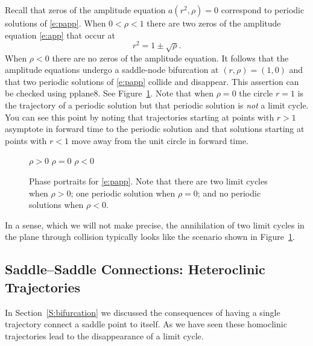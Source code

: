 \documentclass{ximera}
\begin{document}
Recall that zeros of the amplitude equation $a(r^2,\rho)=0$ correspond to 
periodic solutions of \eqref{e:papp}.  When $0<\rho<1$ there are two zeros of 
the amplitude equation \eqref{e:app} that occur at 
\[
r^2 = 1 \pm\sqrt{\rho}.
\]
When $\rho<0$ there are no zeros of the amplitude equation.  
It follows that the amplitude equations undergo a saddle-node 
bifurcation at $(r,\rho)=(1,0)$ and that two periodic solutions of 
\eqref{e:papp} collide and disappear.  This assertion can be 
checked using {\sf pplane8}.  
See Figure~\ref{F:papp}. Note that when $\rho=0$
the circle $r=1$ is the trajectory of a periodic solution but that periodic 
solution is {\em not\/} a limit cycle.  You can see this point by noting that 
trajectories starting at points with $r>1$ asymptote in forward time to the 
periodic solution and that solutions starting at points with $r<1$ move away 
from the unit circle in forward time.  

\begin{figure}[htb]
           \centerline{%
	   }
 	\vspace*{-0.2in}
	\hspace{0.3in} $\rho>0$  \hspace{1.9in} $\rho=0$
		\hspace{1.9in} $\rho<0$ 
           \caption{Phase portraits for \protect\eqref{e:papp}. 
Note that there are two limit cycles when $\rho>0$; one periodic solution 
when  $\rho=0$; and no periodic solutions when $\rho<0$.}
           \label{F:papp}
\end{figure}

In a sense, which we will not make precise, the annihilation of two
limit cycles in the plane through collision typically looks like the 
scenario shown in Figure~\ref{F:papp}.  



\subsection*{Saddle--Saddle Connections: Heteroclinic Trajectories}

In Section~\ref{S:bifurcation} we discussed the consequences of having a 
single trajectory connect a saddle point to itself.  As we have seen these 
homoclinic trajectories lead to the disappearance of a limit cycle.
\end{document}
